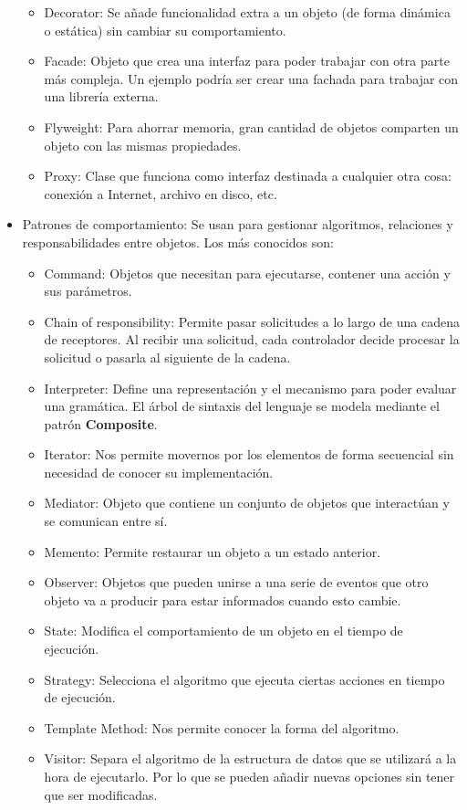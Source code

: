 \documentclass[12pt]{report} %
\begin{document}
\begin{itemize}
\begin{itemize}
 		\item Decorator: Se añade funcionalidad extra a un objeto (de forma dinámica o estática) sin cambiar su comportamiento.
 		\item Facade: Objeto que crea una interfaz para poder trabajar con otra parte más compleja. Un ejemplo podría ser crear una fachada para trabajar con una librería externa.
 		\item Flyweight: Para ahorrar memoria, gran cantidad de objetos comparten un objeto con las mismas propiedades.
 		\item Proxy: Clase que funciona como interfaz destinada a cualquier otra cosa: conexión a Internet, archivo en disco, etc.
 	\end{itemize}
 	\item Patrones de comportamiento: Se usan para gestionar algoritmos, relaciones y responsabilidades entre objetos. Los más conocidos son: 
 	\begin{itemize}
 		\item Command: Objetos que necesitan para ejecutarse, contener una acción y sus parámetros. 
 		\item Chain of responsibility: Permite pasar solicitudes a lo largo de una cadena de receptores. Al recibir una solicitud, cada controlador decide procesar la solicitud o pasarla al siguiente de la cadena.
 		\item Interpreter: Define una representación y el mecanismo para poder evaluar una gramática. El árbol de sintaxis del lenguaje se modela mediante el patrón \textbf{Composite}.
 		\item Iterator: Nos permite movernos por los elementos de forma secuencial sin necesidad de conocer su implementación.
 		\item Mediator: Objeto que contiene un conjunto de objetos que interactúan y se comunican entre sí.
 		\item Memento: Permite restaurar un objeto a un estado anterior.
 		\item Observer: Objetos que pueden unirse a una serie de eventos que otro objeto va a producir para estar informados cuando esto cambie.
 		\item State: Modifica el comportamiento de un objeto en el tiempo de ejecución.
 		\item Strategy: Selecciona el algoritmo que ejecuta ciertas acciones en tiempo de ejecución.
 		\item Template Method: Nos permite conocer la forma del algoritmo.
 		\item Visitor: Separa el algoritmo de la estructura de datos que se utilizará a la hora de ejecutarlo. Por lo que se pueden añadir nuevas opciones sin tener que ser modificadas.
 	\end{itemize}
	 \end{itemize}
\end{document}
